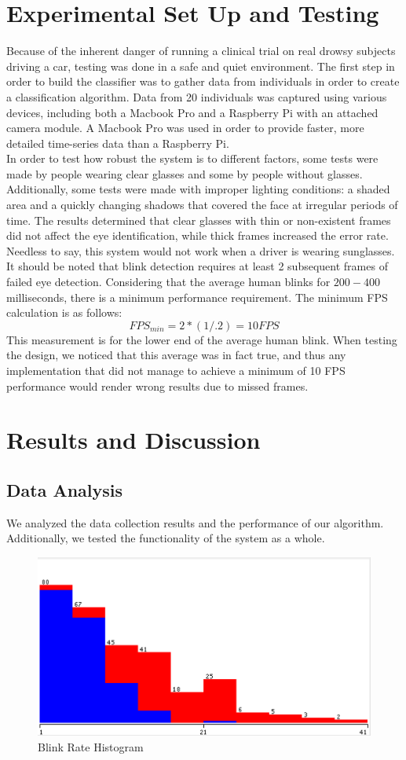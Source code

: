 \documentclass[twocolumn]{article}
\begin{document}
\section{Experimental Set Up and Testing}
Because of the inherent danger of running a clinical trial on real drowsy subjects driving a car, testing was done in a safe and quiet environment.  The first step in order to build the classifier was to gather data from individuals in order to create a classification algorithm. Data from 20 individuals was captured using various devices, including both a Macbook Pro and a Raspberry Pi with an attached camera module. A Macbook Pro was used in order to provide faster, more detailed time-series data than a Raspberry Pi.  \\
In order to test how robust the system is to different factors, some tests were made by people wearing clear glasses and some by people without glasses. Additionally, some tests were made with improper lighting conditions: a shaded area and a quickly changing shadows that covered the face at irregular periods of time. The results determined that clear glasses with thin or non-existent frames did not affect the eye identification, while thick frames increased the error rate. Needless to say, this system would not work when a driver is wearing sunglasses. 
It should be noted that blink detection requires at least 2 subsequent frames of failed eye detection. Considering that the average human blinks for $200-400$ milliseconds, there is a minimum performance requirement. The minimum FPS calculation is as follows:
$$FPS_{min} = 2*(1/.2) = 10 FPS$$ 
This measurement is for the lower end of the average human blink. When testing the design, we noticed that this average was in fact true, and thus any implementation that did not manage to achieve a minimum of 10 FPS performance would render wrong results due to missed frames. \\

\section{Results and Discussion}
\subsection{Data Analysis}
We analyzed the data collection results and the performance of our algorithm. Additionally, we tested the functionality of the system as a whole. 
\begin{figure}[H]
\centering
\includegraphics[width=0.8\linewidth]{./blink_rate.png}
\caption{Blink Rate Histogram }
\label{fig:blink_hist}
\end{figure}
\end{document}
